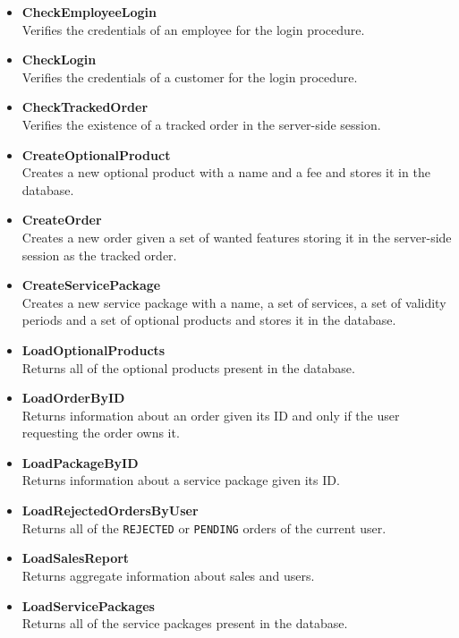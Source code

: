 \begin{itemize}[leftmargin = \leftmargin + 1em, itemindent = -1em]
    \item \textbf{CheckEmployeeLogin} \\
        Verifies the credentials of an employee for the login procedure.
    \item \textbf{CheckLogin} \\
        Verifies the credentials of a customer for the login procedure.
    \item \textbf{CheckTrackedOrder} \\
        Verifies the existence of a tracked order in the server-side session.
    \item \textbf{CreateOptionalProduct} \\
        Creates a new optional product with a name and a fee and stores it in the database.
    \item \textbf{CreateOrder} \\
        Creates a new order given a set of wanted features storing it in the server-side session as the tracked order.
    \item \textbf{CreateServicePackage} \\
        Creates a new service package with a name, a set of services, a set of validity periods and a set of optional products and stores it in the database.
    \item \textbf{LoadOptionalProducts} \\
        Returns all of the optional products present in the database.
    \item \textbf{LoadOrderByID} \\
        Returns information about an order given its ID and only if the user requesting the order owns it.
    \item \textbf{LoadPackageByID} \\
        Returns information about a service package given its ID.
    \item \textbf{LoadRejectedOrdersByUser} \\
        Returns all of the \texttt{REJECTED} or \texttt{PENDING} orders of the current user.
    \item \textbf{LoadSalesReport} \\
        Returns aggregate information about sales and users.
    \item \textbf{LoadServicePackages} \\
        Returns all of the service packages present in the database.

\end{itemize}
